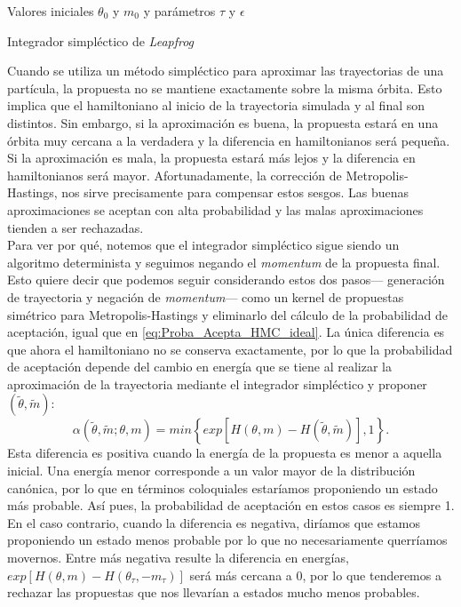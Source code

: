 \begin{algorithm}
\DontPrintSemicolon
Valores iniciales $\theta_0$ y $m_0$ y parámetros $\tau$ y $\epsilon$\;

\caption{Integrador simpléctico de \textit{Leapfrog} \label{alg:Leapfrog}}
\end{algorithm}

Cuando se utiliza un método simpléctico para aproximar las trayectorias de una partícula, la propuesta no se mantiene exactamente sobre la misma órbita. Esto implica que el hamiltoniano al inicio de la trayectoria simulada y al final son distintos. Sin embargo, si la aproximación es buena, la propuesta estará en una órbita muy cercana a la verdadera y la diferencia en hamiltonianos será pequeña. Si la aproximación es mala, la propuesta estará más lejos y la diferencia en hamiltonianos será mayor. Afortunadamente, la corrección de Metropolis-Hastings, nos sirve precisamente para compensar estos sesgos. Las buenas aproximaciones se aceptan con alta probabilidad y las malas aproximaciones tienden a ser rechazadas.\\

Para ver por qué, notemos que el integrador simpléctico sigue siendo un algoritmo determinista y seguimos negando el \textit{momentum} de la propuesta final. Esto quiere decir que podemos seguir considerando estos dos pasos--- generación de trayectoria y negación de \textit{momentum}--- como un kernel de propuestas simétrico para Metropolis-Hastings y eliminarlo del cálculo de la probabilidad de aceptación, igual que en \eqref{eq:Proba_Acepta_HMC_ideal}. La única diferencia es que ahora el hamiltoniano no se conserva exactamente, por lo que la probabilidad de aceptación depende del cambio en energía que se tiene al realizar la aproximación de la trayectoria mediante el integrador simpléctico y proponer $(\tilde{\theta},\tilde{m})$:
\begin{equation}
\alpha(\tilde{\theta},\tilde{m};\theta,m) = min\left\lbrace exp\left[ H(\theta,m)-H(\tilde{\theta},\tilde{m})\right],1\right\rbrace.
\label{eq:Proba_Acepta_HMC}
\end{equation}
Esta diferencia es positiva cuando la energía de la propuesta es menor a aquella inicial. Una energía menor corresponde a un valor mayor de la distribución canónica, por lo que en términos coloquiales estaríamos proponiendo un estado más probable. Así pues, la probabilidad de aceptación en estos casos es siempre 1. En el caso contrario, cuando la diferencia es negativa, diríamos que estamos proponiendo un estado menos probable por lo que no necesariamente querríamos movernos. Entre más negativa resulte la diferencia en energías, $exp\left[ H(\theta,m)-H(\theta_\tau,-m_\tau)\right]$ será más cercana a $0$, por lo que tenderemos a rechazar las propuestas que nos llevarían a estados mucho menos probables.\\

